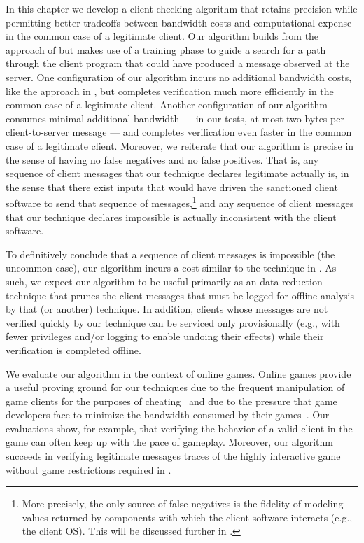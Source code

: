 In this chapter we develop a client-checking algorithm that retains
precision while permitting better tradeoffs between bandwidth costs
and computational expense in the common case of a legitimate client.
Our algorithm builds from the approach of 
 but makes use of a training phase to guide a
search for a path through the client program that could have produced
a message observed at the server.  One configuration of our algorithm
incurs no additional bandwidth costs, like the approach in
, but
completes verification much more efficiently in the common case of a
legitimate client.  Another configuration of our algorithm consumes
minimal additional bandwidth --- in our tests, at most two bytes per
client-to-server message --- and completes verification even faster in
the common case of a legitimate client.  Moreover, we reiterate that
our algorithm is precise in the sense of having no false negatives and
no false positives.  That is, any sequence of client messages that our
technique declares legitimate actually is, in the sense that there
exist inputs that would have driven the sanctioned client software to
send that sequence of messages,\footnote{More precisely, the only
source of false negatives is the fidelity of modeling values returned
by components with which the client software interacts (e.g., the
client OS).  This will be discussed further in .} and
any sequence of client messages that our technique declares impossible
is actually inconsistent with the client software.

To definitively conclude that a sequence of client messages is
impossible (the uncommon case), our algorithm incurs a cost similar to
the technique in .  As such, we expect
our algorithm to be useful primarily as an data reduction
technique that prunes the client messages that must be logged for
offline analysis by that (or another) technique.  In addition, clients
whose messages are not verified quickly by our technique can be
serviced only provisionally (e.g., with fewer privileges and/or
logging to enable undoing their effects) while their verification is
completed offline.

We evaluate our algorithm in the context of online games.  Online
games provide a useful proving ground for our techniques due to the
frequent manipulation of game clients for the purposes of
cheating~\cite{yan05:classification,lyhyaoui05:categorization,webb08:survey}
and due to the pressure that game developers face to minimize the
bandwidth consumed by their games~\cite{mulligan03:guide}.
Our evaluations show, for example, that
verifying the behavior of a valid client in the \tetrinet game can
often keep up with the pace of gameplay.  Moreover, our algorithm
succeeds in verifying legitimate messages traces of the highly interactive
\xpilot game without game restrictions required in .

